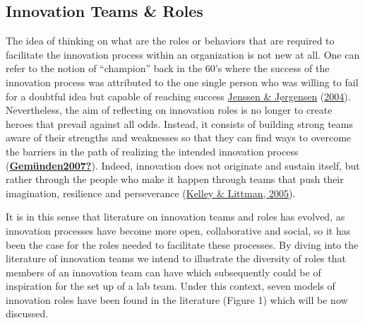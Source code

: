 \documentclass[]{elsarticle} %
\begin{document}
\hypertarget{innovation-teams-roles}{%
\subsection{Innovation Teams \& Roles}\label{innovation-teams-roles}}

The idea of thinking on what are the roles or behaviors that are
required to facilitate the innovation process within an organization is
not new at all. One can refer to the notion of ``champion'' back in the
60's where the success of the innovation process was attributed to the
one single person who was willing to fail for a doubtful idea but
capable of reaching success \protect\hyperlink{ref-Jenssen2004}{Jenssen
\& Jørgensen} (\protect\hyperlink{ref-Jenssen2004}{2004}). Nevertheless,
the aim of reflecting on innovation roles is no longer to create heroes
that prevail against all odds. Instead, it consists of building strong
teams aware of their strengths and weaknesses so that they can find ways
to overcome the barriers in the path of realizing the intended
innovation process
(\protect\hyperlink{ref-Gemuxfcnden2007}{\textbf{Gemünden2007?}}).
Indeed, innovation does not originate and sustain itself, but rather
through the people who make it happen through teams that push their
imagination, resilience and perseverance
(\protect\hyperlink{ref-Kelley2005}{Kelley \& Littman, 2005}).

It is in this sense that literature on innovation teams and roles has
evolved, as innovation processes have become more open, collaborative
and social, so it has been the case for the roles needed to facilitate
these processes. By diving into the literature of innovation teams we
intend to illustrate the diversity of roles that members of an
innovation team can have which subsequently could be of inspiration for
the set up of a lab team. Under this context, seven models of innovation
roles have been found in the literature (Figure 1) which will be now
discussed.
\end{document}
